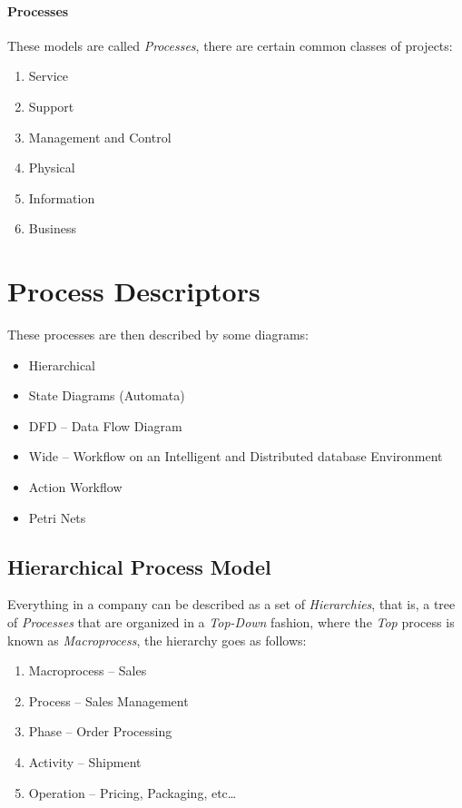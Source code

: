 \documentclass[openright, twoside, twocolumn]{report}
\begin{document}
    \paragraph{Processes}
    These models are called \emph{Processes}, there are certain common classes of projects:

    \begin{enumerate}
      \item Service
      \item Support
      \item Management and Control
      \item Physical
      \item Information
      \item Business
    \end{enumerate}

    \section{Process Descriptors}

    These processes are then described by some diagrams:

    \begin{itemize}
      \item Hierarchical
      \item State Diagrams (Automata)
      \item DFD -- Data Flow Diagram
      \item Wide -- Workflow on an Intelligent and Distributed database Environment
      \item Action Workflow
      \item Petri Nets
    \end{itemize}

    \subsection{Hierarchical Process Model}

    Everything in a company can be described as a set of \emph{Hierarchies}, that is, a tree of
    \emph{Processes} that are organized in a \emph{Top-Down} fashion, where the \emph{Top}
    process is known as \emph{Macroprocess}, the hierarchy goes as follows:

    \begin{enumerate}
      \item Macroprocess -- Sales
      \item Process -- Sales Management
      \item Phase -- Order Processing
      \item Activity -- Shipment
      \item Operation -- Pricing, Packaging, etc\dots
    \end{enumerate}
\end{document}

